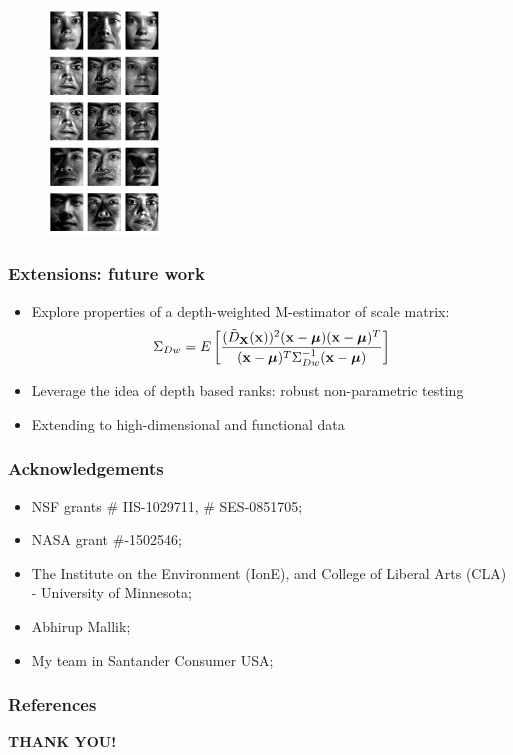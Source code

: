 \documentclass[handout,10pt]{beamer}
\begin{document}
\begin{frame}
\begin{figure}[h]
		\includegraphics[width=3cm]{yaleB28recon.png}
	\label{fig:kdpca}
\end{figure}
\end{frame}

\begin{frame}
\frametitle{Extensions: future work}
\begin{itemize}
\item Explore properties of a depth-weighted M-estimator of scale matrix:
$$ \Sigma_{Dw} = E \left[ \frac{(\tilde D_{\mathbf{X}}({\bf{x}}))^2 ({\bf{x}} - {\boldsymbol{\mu}}) ({\bf{x}} - {\boldsymbol{\mu}})^T}{({\bf{x}} - {\boldsymbol{\mu}})^T \Sigma_{Dw}^{-1} ({\bf{x}} - {\boldsymbol{\mu}})} \right] $$
\vspace{.5cm}

\item Leverage the idea of depth based ranks: robust non-parametric testing

\item Extending to high-dimensional and functional data
\end{itemize}
\end{frame}

\begin{frame}
\frametitle{Acknowledgements}
\begin{itemize}
\item NSF grants \# IIS-1029711, \# SES-0851705;
\vspace{.2cm}
\item NASA grant \#-1502546;
\vspace{.2cm}
\item The Institute on the Environment (IonE), and College of Liberal Arts (CLA) - University of Minnesota;
\vspace{.2cm}
\item Abhirup Mallik;
\vspace{.2cm}
\item My team in Santander Consumer USA;
\end{itemize}
\end{frame}

\begin{frame}
\frametitle{References}


\end{frame}


\begin{frame}
\centering\huge
\textcolor{UniBlue}{\textbf{THANK YOU!}}
\end{frame}
\end{document}
